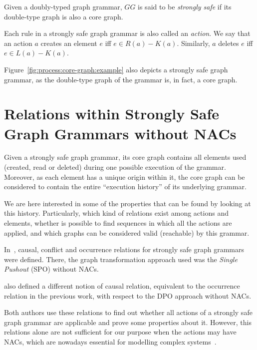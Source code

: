 \begin{definition} Given \doublyTypedGraphGrammarCore{} a doubly-typed graph grammar, $GG$ is said to be \emph{strongly safe} if its double-type graph is also a core graph.

  Each rule in a strongly safe graph grammar is also called an \emph{action}. We say that an action $a$ creates an element $e$ iff $e \in R(a) - K(a)$. Similarly, $a$ deletes $e$ iff \mbox{$e \in L(a) - K(a)$}.
\end{definition}

\begin{example} Figure~\ref{fig:process:core-graph:example} also depicts a strongly safe graph grammar, as the double-type graph of the grammar is, in fact, a core graph.
\end{example}

\section{Relations within Strongly Safe Graph Grammars without NACs}

Given a strongly safe graph grammar, its core graph contains all elements used (created, read or deleted) during one possible execution of the grammar. Moreover, as each element has a unique origin within it, the core graph can be considered to contain the entire ``execution history'' of its underlying grammar.

We are here interested in some of the properties that can be found by looking at this history. Particularly, which kind of relations exist among actions and elements, whether is possible to find sequences in which all the actions are applied, and which graphs can be considered valid (reachable) by this grammar.

In~\cite{Ribeiro1996}, causal, conflict and occurrence relations for strongly safe graph grammars were defined. There, the graph transformation approach used was the \emph{Single Pushout} (SPO) without NACs. 

\cite{Corradini1996} also defined a different notion of causal relation, equivalent to the occurrence relation in the previous work, with respect to the DPO approach without NACs.

Both authors use these relations to find out whether all actions of a strongly safe graph grammar are applicable and prove some properties about it. However, this relations alone are not sufficient for our purpose when the actions may have NACs, which are nowadays essential for modelling complex systems~\cite{Corradini2014}.

